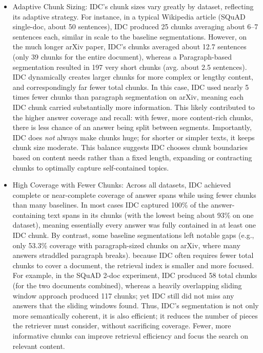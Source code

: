 \documentclass[12pt,a4paper]{report}
\begin{document}
\begin{itemize}
\item Adaptive Chunk Sizing: IDC's chunk sizes vary greatly by dataset, reflecting its adaptive strategy. For instance, in a typical Wikipedia article (SQuAD single-doc, about 50 sentences), IDC produced 25 chunks averaging about 6--7 sentences each, similar in scale to the baseline segmentations. However, on the much longer arXiv paper, IDC's chunks averaged about 12.7 sentences (only 39 chunks for the entire document), whereas a Paragraph-based segmentation resulted in 197 very short chunks (avg. about 2.5 sentences). IDC dynamically creates larger chunks for more complex or lengthy content, and correspondingly far fewer total chunks. In this case, IDC used nearly 5 times fewer chunks than paragraph segmentation on arXiv, meaning each IDC chunk carried substantially more information. This likely contributed to the higher answer coverage and recall: with fewer, more content-rich chunks, there is less chance of an answer being split between segments. Importantly, IDC does \textit{not} always make chunks huge; for shorter or simpler texts, it keeps chunk size moderate. This balance suggests IDC chooses chunk boundaries based on content needs rather than a fixed length, expanding or contracting chunks to optimally capture self-contained topics.

\item High Coverage with Fewer Chunks: Across all datasets, IDC achieved complete or near-complete coverage of answer spans while using fewer chunks than many baselines. In most cases IDC captured 100\% of the answer-containing text spans in its chunks (with the lowest being about 93\% on one dataset), meaning essentially every answer was fully contained in at least one IDC chunk. By contrast, some baseline segmentations left notable gaps (e.g., only 53.3\% coverage with paragraph-sized chunks on arXiv, where many answers straddled paragraph breaks). because IDC often requires fewer total chunks to cover a document, the retrieval index is smaller and more focused. For example, in the SQuAD 2-doc experiment, IDC produced 58 total chunks (for the two documents combined), whereas a heavily overlapping sliding window approach produced 117 chunks; yet IDC still did not miss any answers that the sliding windows found. Thus, IDC's segmentation is not only more semantically coherent, it is also efficient; it reduces the number of pieces the retriever must consider, without sacrificing coverage. Fewer, more informative chunks can improve retrieval efficiency and focus the search on relevant content.
\end{itemize}
\end{document}
